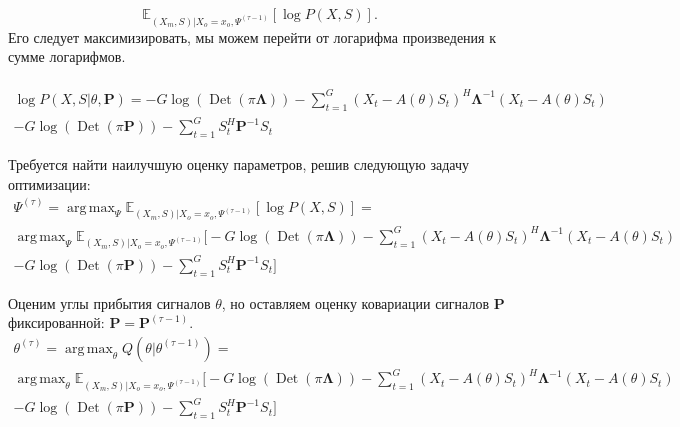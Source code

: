 \documentclass[11pt]{article}
\newcommand{\Expect}{\mathbb{E}}
\DeclareMathOperator*{\argmax}{arg\,max}
\DeclareMathOperator{\Det}{Det}
\begin{document}
\begin{equation*}
 \Expect_{(X_m,S)|X_o=x_o, \Psi^{(\tau-1)}}[\log P(X, S)].
\end{equation*}
Его следует максимизировать, мы можем перейти от логарифма произведения к сумме логарифмов. 
\\
\\
\begin{equation*}
\begin{gathered}
\log P(X,S|\theta, \mathbf{P}) = -G \log (\Det(\pi \mathbf{\Lambda})) - \sum_{t=1}^G (X_t-A(\theta)S_t)^H \mathbf{\Lambda}^{-1}(X_t-A(\theta)S_t) 
\\ - G \log(\Det(\pi \mathbf{P})) - \sum_{t=1}^G S_t^H \mathbf{P}^{-1}S_t
\end{gathered}
\end{equation*}
\begin{center}
\fontsize{14}{18}\selectfont {}
\end{center}
Требуется найти наилучшую оценку параметров, решив следующую задачу оптимизации:
\begin{equation*}
\begin{gathered}
\Psi^{(\tau)}=\argmax_{\Psi} \Expect_{(X_m,S)|X_o=x_o, \Psi^{(\tau-1)}}[\log P(X, S)] = \\
\argmax_{\Psi} \Expect_{(X_m,S)|X_o=x_o, \Psi^{(\tau-1)}}\bigg[-G \log (\Det(\pi \mathbf{\Lambda})) - \sum_{t=1}^G (X_t-A(\theta)S_t)^H \mathbf{\Lambda}^{-1}(X_t-A(\theta)S_t) 
\\ - G \log(\Det(\pi \mathbf{P})) - \sum_{t=1}^G S_t^H \mathbf{P}^{-1}S_t\bigg]
\end{gathered}
\end{equation*}
\clearpage
\begin{center}
\fontsize{14}{18}\selectfont {}
\end{center}
Оценим углы прибытия сигналов $\theta$, но оставляем оценку ковариации сигналов $\mathbf{P}$ фиксированной: $\mathbf{P} = \mathbf{P}^{(\tau-1)}$.
\begin{equation*}
\begin{gathered}
\theta^{(\tau)}= \argmax_{\theta} Q(\theta | \theta^{(\tau-1)}) = \\
\argmax_{\theta} \Expect_{(X_m,S)|X_o=x_o, \Psi^{(\tau-1)}}\bigg[-G \log (\Det(\pi \mathbf{\Lambda})) - \sum_{t=1}^G (X_t-A(\theta)S_t)^H \mathbf{\Lambda}^{-1}(X_t-A(\theta)S_t) 
\\ - G \log(\Det(\pi \mathbf{P})) - \sum_{t=1}^G S_t^H \mathbf{P}^{-1}S_t\bigg]
\end{gathered}
\end{equation*}
\end{document}
